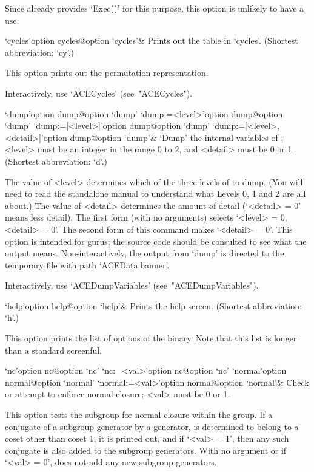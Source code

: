 Since {\GAP} already provides `Exec()' for this purpose,  this  option
is unlikely to have a use.

\enditems


\beginitems

\>`cycles'{option cycles}@{option `cycles'}&
Prints out the table in `cycles'. (Shortest abbreviation: `cy'.)

This option prints out the permutation representation.

Interactively, use `ACECycles' (see~"ACECycles").

\>`dump'{option dump}@{option `dump'}
\>`dump:=<level>'{option dump}@{option `dump'}
\>`dump:=[<level>]'{option dump}@{option `dump'}
\>`dump:=[<level>, <detail>]'{option dump}@{option `dump'}&
`Dump' the internal variables of {\ACE}; <level> must be an integer in
the range 0 to 2, and <detail> must be 0 or 1.
(Shortest abbreviation: `d'.)

The value of <level> determines which of the three levels of {\ACE} to
dump. (You will need to read the standalone manual to understand  what
Levels 0, 1 and 2 are all about.) The value of <detail> determines the
amount of detail (`<detail> = 0' means less detail).  The  first  form
(with no arguments) selects `<level> = 0, <detail> =  0'.  The  second
form of this command makes `<detail> = 0'. This option is intended for
gurus; the source code should be consulted  to  see  what  the  output
means. Non-interactively, the output from `dump' is  directed  to  the
temporary file with path `ACEData.banner'.

Interactively, use `ACEDumpVariables' (see~"ACEDumpVariables").

\>`help'{option help}@{option `help'}&
Prints the {\ACE} help screen. (Shortest abbreviation: `h'.)

This option prints the list of options of the {\ACE} binary. Note that
this list is longer than a standard screenful.

\>`nc'{option nc}@{option `nc'}
\>`nc:=<val>'{option nc}@{option `nc'}
\>`normal'{option normal}@{option `normal'}
\>`normal:=<val>'{option normal}@{option `normal'}&
Check or attempt to enforce normal closure; <val> must be 0 or 1.

This option tests the subgroup for normal closure within the group. If
a conjugate of a subgroup generator by a generator, is  determined  to
belong to a coset other than coset 1, it is printed out, and if `<val>
=  1',  then  any  such  conjugate  is  also  added  to  the  subgroup
generators. With no argument or if `<val> = 0', {\ACE}  does  not  add
any new subgroup generators.

